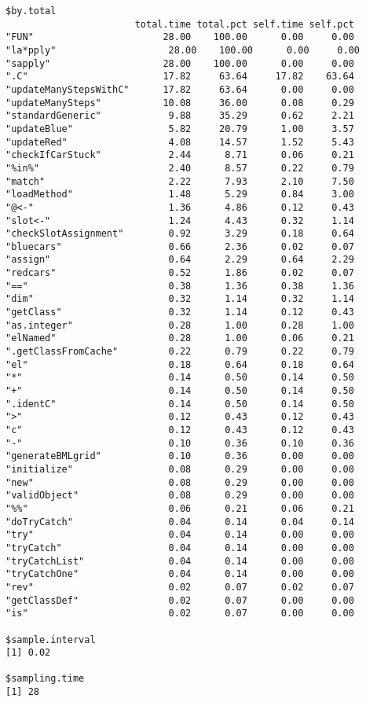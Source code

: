 \documentclass[11pt]{article}
\begin{document}
\begin{verbatim}
$by.total
                       total.time total.pct self.time self.pct
"FUN"                       28.00    100.00      0.00     0.00
"la*pply"                    28.00    100.00      0.00     0.00
"sapply"                    28.00    100.00      0.00     0.00
".C"                        17.82     63.64     17.82    63.64
"updateManyStepsWithC"      17.82     63.64      0.00     0.00
"updateManySteps"           10.08     36.00      0.08     0.29
"standardGeneric"            9.88     35.29      0.62     2.21
"updateBlue"                 5.82     20.79      1.00     3.57
"updateRed"                  4.08     14.57      1.52     5.43
"checkIfCarStuck"            2.44      8.71      0.06     0.21
"%in%"                       2.40      8.57      0.22     0.79
"match"                      2.22      7.93      2.10     7.50
"loadMethod"                 1.48      5.29      0.84     3.00
"@<-"                        1.36      4.86      0.12     0.43
"slot<-"                     1.24      4.43      0.32     1.14
"checkSlotAssignment"        0.92      3.29      0.18     0.64
"bluecars"                   0.66      2.36      0.02     0.07
"assign"                     0.64      2.29      0.64     2.29
"redcars"                    0.52      1.86      0.02     0.07
"=="                         0.38      1.36      0.38     1.36
"dim"                        0.32      1.14      0.32     1.14
"getClass"                   0.32      1.14      0.12     0.43
"as.integer"                 0.28      1.00      0.28     1.00
"elNamed"                    0.28      1.00      0.06     0.21
".getClassFromCache"         0.22      0.79      0.22     0.79
"el"                         0.18      0.64      0.18     0.64
"*"                          0.14      0.50      0.14     0.50
"+"                          0.14      0.50      0.14     0.50
".identC"                    0.14      0.50      0.14     0.50
">"                          0.12      0.43      0.12     0.43
"c"                          0.12      0.43      0.12     0.43
"-"                          0.10      0.36      0.10     0.36
"generateBMLgrid"            0.10      0.36      0.00     0.00
"initialize"                 0.08      0.29      0.00     0.00
"new"                        0.08      0.29      0.00     0.00
"validObject"                0.08      0.29      0.00     0.00
"%%"                         0.06      0.21      0.06     0.21
"doTryCatch"                 0.04      0.14      0.04     0.14
"try"                        0.04      0.14      0.00     0.00
"tryCatch"                   0.04      0.14      0.00     0.00
"tryCatchList"               0.04      0.14      0.00     0.00
"tryCatchOne"                0.04      0.14      0.00     0.00
"rev"                        0.02      0.07      0.02     0.07
"getClassDef"                0.02      0.07      0.00     0.00
"is"                         0.02      0.07      0.00     0.00

$sample.interval
[1] 0.02

$sampling.time
[1] 28
\end{verbatim}
\end{document}
